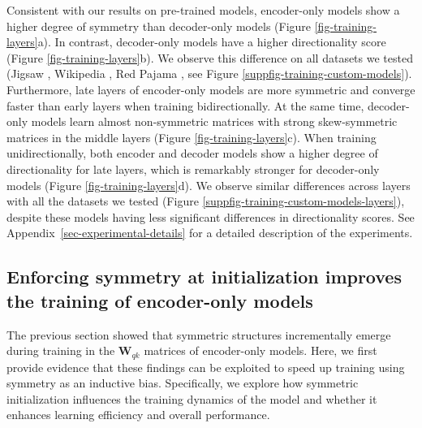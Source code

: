 Consistent with our results on pre-trained models, encoder-only models show a higher degree of symmetry than decoder-only models (Figure \ref{fig-training-layers}a). 
%
In contrast, decoder-only models have a higher directionality score (Figure \ref{fig-training-layers}b).
%
We observe this difference on all datasets we tested (Jigsaw \citep{jigsaw_challenge}, Wikipedia \citep{wikidump}, Red Pajama \citep{together2023redpajama}, see Figure \ref{suppfig-training-custom-models}).
%
Furthermore, late layers of encoder-only models are more symmetric and converge faster than early layers when training bidirectionally. At the same time, decoder-only models learn almost non-symmetric matrices with strong skew-symmetric matrices in the middle layers (Figure \ref{fig-training-layers}c).
% 
When training unidirectionally, both encoder and decoder models show a higher degree of directionality for late layers, which is remarkably stronger for decoder-only models (Figure \ref{fig-training-layers}d).
%
We observe similar differences across layers with all the datasets we tested (Figure \ref{suppfig-training-custom-models-layers}), despite these models having
less significant differences in directionality scores.
%
See Appendix~\ref{sec-experimental-details} for a detailed description of the experiments.
% 







\subsection{Enforcing symmetry at initialization improves the training of encoder-only models}
\label{sec-symmetric-initialization}
%

%
The previous section showed that symmetric structures incrementally emerge during training in the $\bm{W}_{qk}$ matrices of encoder-only models.
%
Here, we first provide evidence that these findings can be exploited to speed up training using symmetry as an inductive bias.
%
Specifically, we explore how symmetric initialization influences the training dynamics of the model and whether it enhances learning efficiency and overall performance.
%

